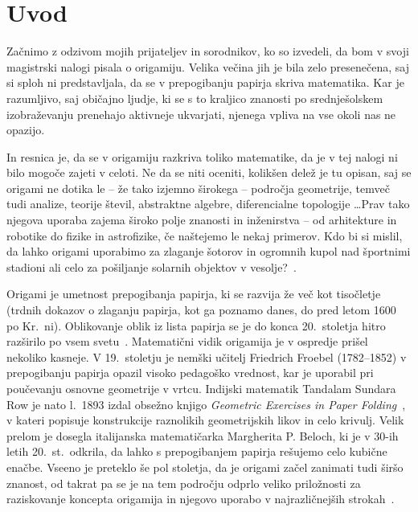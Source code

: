 \section{Uvod}

Začnimo z odzivom mojih prijateljev in sorodnikov, ko so izvedeli, da bom v svoji magistrski nalogi pisala o origamiju. Velika večina jih je bila zelo presenečena, saj si sploh ni predstavljala, da se v prepogibanju papirja skriva matematika. Kar je razumljivo, saj običajno ljudje, ki se s to kraljico znanosti po srednješolskem izobraževanju prenehajo aktivneje ukvarjati, njenega vpliva na vse okoli nas ne opazijo.

In resnica je, da se v origamiju razkriva toliko matematike, da je v tej nalogi ni bilo mogoče zajeti v celoti. Ne da se niti oceniti, kolikšen delež je tu opisan, saj se origami ne dotika le -- že tako izjemno širokega -- področja geometrije, temveč tudi analize, teorije števil, abstraktne algebre, diferencialne topologije \ldots Prav tako njegova uporaba zajema široko polje znanosti in inženirstva -- od arhitekture in robotike do fizike in astrofizike, če naštejemo le nekaj primerov. Kdo bi si mislil, da lahko origami uporabimo za zlaganje šotorov in ogromnih kupol nad športnimi stadioni ali celo za pošiljanje solarnih objektov v vesolje?~\cite[str.\ 3--5]{hull2020}.

Origami je umetnost prepogibanja papirja, ki se razvija že več kot tisočletje (trdnih dokazov o zlaganju papirja, kot ga poznamo danes, do pred letom 1600 po Kr.\ ni). Oblikovanje oblik iz lista papirja se je do konca 20.\ stoletja hitro razširilo po vsem svetu~\cite{robinson2024}. Matematični vidik origamija je v ospredje prišel nekoliko kasneje. V 19.\ stoletju je nemški učitelj Friedrich Froebel (1782--1852) v prepogibanju papirja opazil visoko pedagoško vrednost, kar je uporabil pri poučevanju osnovne geometrije v vrtcu. Indijski matematik Tandalam Sundara Row je nato l.\ 1893 izdal obsežno knjigo \emph{Geometric Exercises in Paper Folding}~\cite{row1917}, v kateri popisuje konstrukcije raznolikih geometrijskih likov in celo krivulj. Velik prelom je dosegla italijanska matematičarka Margherita P. Beloch, ki je v 30-ih letih 20.\ st.\ odkrila, da lahko s prepogibanjem papirja rešujemo celo kubične enačbe. Vseeno je preteklo še pol stoletja, da je origami začel zanimati tudi širšo znanost, od takrat pa se je na tem področju odprlo veliko priložnosti za raziskovanje koncepta origamija in njegovo uporabo v najrazličnejših strokah~\cite[str.\ 10]{hull2020}.

